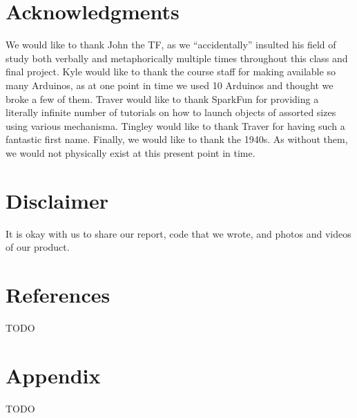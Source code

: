 \documentclass{es50report}
\begin{document}
    \section{Acknowledgments}
        We would like to thank John the TF, as we ``accidentally'' insulted his field of study both verbally and metaphorically multiple times throughout this class and final project. Kyle would like to thank the course staff for making available so many Arduinos, as at one point in time we used 10 Arduinos and thought we broke a few of them. Traver would like to thank SparkFun for providing a literally infinite number of tutorials on how to launch objects of assorted sizes using various mechanisma. Tingley would like to thank Traver for having such a fantastic first name. Finally, we would like to thank the 1940s. As without them, we would not physically exist at this present point in time.

    \section{Disclaimer}
        It is okay with us to share our report, code that we wrote, and photos and videos of our product.

    \section{References}
    TODO

    \appendix
    \section{Appendix}
    TODO
\end{document}
